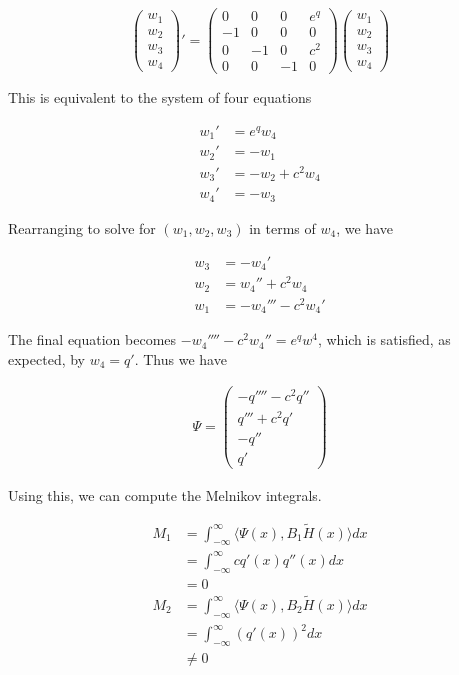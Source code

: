 \documentclass[12pt]{article}
\begin{document}
\begin{enumerate}
\begin{equation}
\begin{pmatrix}w_1 \\ w_2 \\ w_3 \\ w_4 \end{pmatrix}' =
\begin{pmatrix}
0 & 0 & 0 & e^q \\
-1 & 0 & 0 & 0 \\
0 & -1 & 0 & c^2 \\
0 & 0 & -1 & 0 
\end{pmatrix}
\begin{pmatrix}w_1 \\ w_2 \\ w_3 \\ w_4 \end{pmatrix}
\end{equation}

This is equivalent to the system of four equations

\begin{align*}
w_1' &= e^q w_4 \\
w_2' &= -w_1 \\
w_3' &= -w_2 + c^2 w_4 \\
w_4' &= -w_3
\end{align*}

Rearranging to solve for $(w_1, w_2, w_3)$ in terms of $w_4$, we have

\begin{align*}
w_3 &= -w_4' \\
w_2 &= w_4'' + c^2 w_4 \\
w_1 &= -w_4''' - c^2 w_4'
\end{align*}

The final equation becomes $-w_4'''' - c^2 w_4'' = e^q w^4$, which is satisfied, as expected, by $w_4 = q'$. Thus we have

\begin{align*}
\Psi = \begin{pmatrix}
-q'''' - c^2 q''\\
q''' + c^2 q'\\
-q''\\
q'
\end{pmatrix}
\end{align*}

Using this, we can compute the Melnikov integrals.

\begin{align*}
M_1 &= \int_{-\infty}^\infty \langle \Psi(x), B_1 \tilde{H}(x) \rangle dx \\
&= \int_{-\infty}^\infty c q'(x) q''(x) dx \\
&= 0 \\
M_2 &= \int_{-\infty}^\infty \langle \Psi(x), B_2 \tilde{H}(x) \rangle dx \\
&= \int_{-\infty}^\infty  (q'(x))^2 dx \\
&\neq 0
\end{align*}


\end{enumerate}
\end{document}
